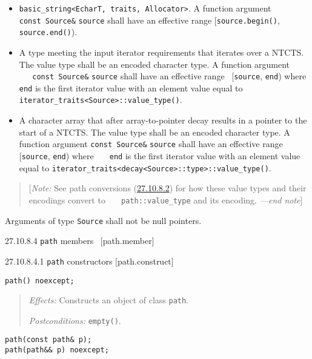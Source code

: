 \begin{itemize}
\tightlist
\item
  \texttt{basic\_string\textless{}EcharT,\ traits,\ Allocator\textgreater{}}.
  A function argument \texttt{const\ Source\&} \texttt{source} shall
  have an effective range {[}\texttt{source.begin()},
  \texttt{source.end()}).
\item
  A type meeting the input iterator requirements that iterates over a
  NTCTS. The value type shall be an encoded character type. A function
  argument \texttt{\ \ \ const\ Source\&} \texttt{source} shall have an
  effective range~ {[}\texttt{source}, \texttt{end}) where \texttt{end}
  is the first iterator value with an element value equal to
  \texttt{iterator\_traits\textless{}Source\textgreater{}::value\_type()}.
\item
  A character array that after array-to-pointer decay results in a
  pointer to the start of a NTCTS. The value type shall be an encoded
  character type. A function argument \texttt{const\ Source\&}
  \texttt{source} shall have an effective range {[}\texttt{source},
  \texttt{end}) where \texttt{\ \ \ end} is the first iterator value
  with an element value equal to
  \texttt{iterator\_traits\textless{}decay\textless{}Source\textgreater{}::type\textgreater{}::value\_type()}.
\end{itemize}

\begin{quote}
{[}\emph{Note:} See path conversions (\hyperref[path.cvt]{27.10.8.2})
for how these value types and their encodings convert to
\texttt{\ \ \ path::value\_type} and its encoding. \emph{---end note}{]}
\end{quote}

Arguments of type \texttt{Source} shall not be null pointers.

27.10.8.4 \texttt{path} members~ {[}path.member{]}

27.10.8.4.1 \texttt{path} constructors {[}path.construct{]}

\begin{verbatim}
path() noexcept;
\end{verbatim}

\begin{quote}
\emph{Effects:} Constructs an object of class \texttt{path}.

\emph{Postconditions:} \texttt{empty()}.
\end{quote}

\begin{verbatim}
path(const path& p);
path(path&& p) noexcept;
\end{verbatim}

